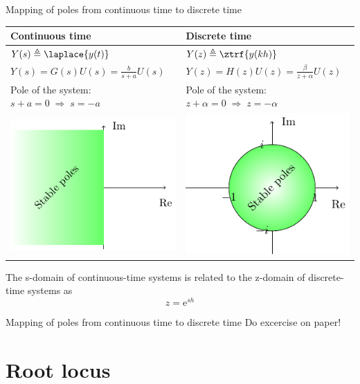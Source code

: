 \documentclass[presentation,aspectratio=169]{beamer}
\begin{document}
\begin{frame}[label={sec:org75a559f}]{Mapping of poles from continuous time to discrete time}
\begin{center}
\begin{tabular}{ll}
Continuous time & Discrete time\\
\hline
\(Y(s) \triangleq \laplace{y(t)}\) & \(Y(z) \triangleq \ztrf{y(kh)}\)\\
\(Y(s) = G(s)U(s) = \frac{b}{s+a}U(s)\) & \(Y(z) = H(z)U(z) = \frac{\beta}{z+\alpha}U(z)\)\\
Pole of the system: \(s+a=0 \; \Rightarrow \; s = -a\) & Pole of the system: \(z+\alpha = 0 \; \Rightarrow \; z = -\alpha\)\\
\includegraphics[width=0.22\linewidth]{../../figures/cont-stable} & \includegraphics[width=0.22\linewidth]{../../figures/discrete-stable}\\
\hline
\end{tabular}
\end{center}

The \alert{s-domain} of continuous-time systems is related to the \alert{z-domain} of discrete-time systems as  \[z = \mathrm{e}^{sh}\]
\end{frame}

\begin{frame}[label={sec:org4177f6b}]{Mapping of poles from continuous time to discrete time}
Do excercise on paper!
\end{frame}

\section{Root locus}
\label{sec:org1da210f}
\end{document}
